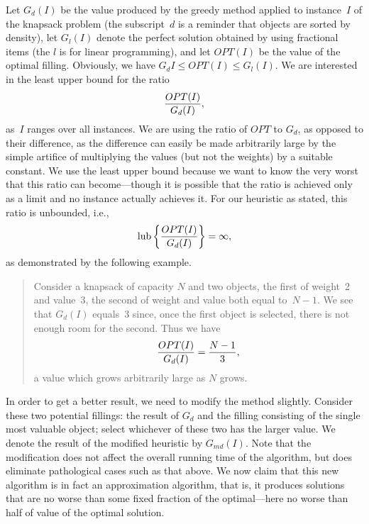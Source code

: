 \documentclass[11pt]{article}
\begin{document}
Let $G_d(I)$ be the value produced by the greedy method
applied to instance~$I$ of the knapsack problem (the subscript~$d$
is a reminder that objects are sorted by density), let $G_l(I)$
denote the perfect solution obtained by using fractional items
(the $l$ is for linear programming), and let $OPT(I)$ be the value
of the optimal filling.  Obviously, we have $G_d{I}\leq OPT(I)\leq G_l(I)$.
We are interested in the least upper bound for the ratio
\begin{displaymath}
  {OPT(I) \over G_d(I)},
\end{displaymath}
as~$I$ ranges over all instances.
We are using the ratio of $OPT$ to $G_d$, as opposed to their difference,
as the difference can easily be made arbitrarily large by the simple
artifice of multiplying the values (but not the weights) by a suitable
constant.  We use the least upper bound because we want to know the very worst
that this ratio can become---though it is possible that the ratio is achieved
only as a limit and no instance actually achieves it.
For our heuristic as stated, this ratio is unbounded, i.e.,
\begin{displaymath}
  \hbox{\rm lub} \left\{ {OPT(I) \over G_d (I)} \right\} = \infty,
\end{displaymath}
as demonstrated by the following example.
\begin{quote}
  Consider a knapsack of capacity $N$ and two objects, the first of weight~2
  and value~3, the second of weight and value both equal to~$N-1$.  We see that
  $G_d (I)$ equals~$3$ since, once the first object is selected, there is not
  enough room for the second.  Thus we have
  \begin{displaymath}
    {OPT(I) \over G_d (I)} = {N-1 \over 3},
  \end{displaymath}
  a value which grows arbitrarily large as $N$ grows.
\end{quote}
In order to get a better result, we need to modify the method slightly.
Consider these two potential fillings: the result of $G_d$ and the filling
consisting of the single most valuable object; select whichever of these two
has the larger value.
We denote the result of the modified heuristic by $G_{md}(I)$.  Note that
the modification does not affect the overall running time of the algorithm,
but does eliminate pathological cases such as that above.
We now claim that this new algorithm is in fact an approximation algorithm,
that is, it produces solutions that are no worse than some fixed fraction
of the optimal---here no worse than half of value of the optimal solution.
\end{document}
